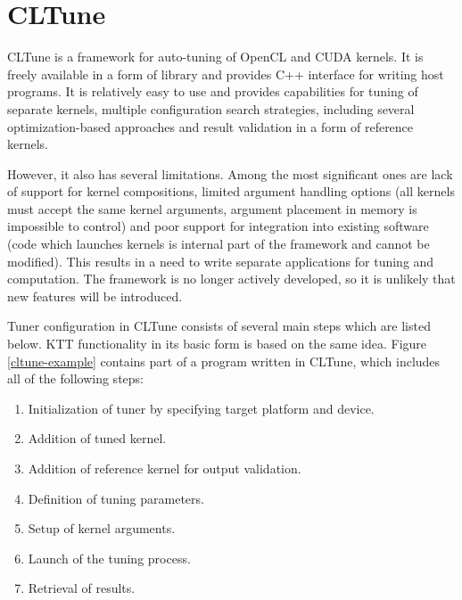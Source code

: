 \documentclass
[
    digital, %
    oneside, %
    table, %
    nolof, %
    nolot, %
    nocover %
]{fithesis3}
\begin{document}
\section{CLTune}
CLTune \cite{cltune} is a framework for auto-tuning of OpenCL and CUDA kernels. It is freely available in a form of library and provides C++ interface
for writing host programs. It is relatively easy to use and provides capabilities for tuning of separate kernels, multiple configuration search
strategies, including several optimization-based approaches and result validation in a form of reference kernels.

However, it also has several limitations. Among the most significant ones are lack of support for kernel compositions, limited argument handling
options (all kernels must accept the same kernel arguments, argument placement in memory is impossible to control) and poor support for integration into
existing software (code which launches kernels is internal part of the framework and cannot be modified). This results in a need to write separate
applications for tuning and computation. The framework is no longer actively developed, so it is unlikely that new features will be introduced.

Tuner configuration in CLTune consists of several main steps which are listed below. KTT functionality in its basic form is based on the same idea.
Figure \ref{cltune-example} contains part of a program written in CLTune, which includes all of the following steps:
\begin{enumerate}
    \item Initialization of tuner by specifying target platform and device.
    \item Addition of tuned kernel.
    \item Addition of reference kernel for output validation.
    \item Definition of tuning parameters.
    \item Setup of kernel arguments.
    \item Launch of the tuning process.
    \item Retrieval of results.
\end{enumerate}
\end{document}
